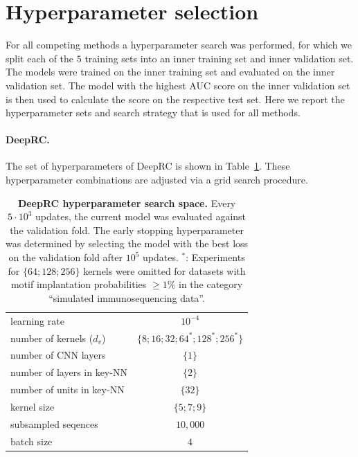 \documentclass[oneside]{book}
\begin{document}
\clearpage
\section{Hyperparameter selection}
\label{sec:hyperparams}
For all competing methods a hyperparameter search was performed,
for which we split each 
of the $5$ training sets into an inner training set and 
inner validation set.
The models were trained on the inner training set and 
evaluated on the inner validation set.
The model with the highest AUC score on the inner validation 
set is then used to 
calculate the score on the respective test set.
Here
we report the hyperparameter sets and search strategy that is
used for all methods. 

\paragraph{DeepRC.}
The set of hyperparameters of DeepRC is shown in 
Table~\ref{tab:deeprc_settings}. These hyperparameter
combinations are adjusted via a grid search procedure.

\begin{table}[htp]%
    \begin{center}%
        \begin{tabular}{lc}%
            \toprule
            learning rate & $10^{-4}$ \\
            number of kernels ($d_v$) & $\{8;16;32;64^*;128^*;256^*\}$ \\
            number of CNN layers & $\{1\}$ \\
            number of layers in key-NN & $\{2\}$ \\
            number of units in key-NN & $\{32\}$ \\
            kernel size & $\{5;7;9\}$ \\
            subsampled seqences & $10,000$ \\
            batch size & $4$ \\
            \bottomrule
        \end{tabular}%
        \caption[DeepRC hyperparameter search space]{\textbf{DeepRC hyperparameter search space.}
        Every $5\cdot10^{3}$ updates, the current model was evaluated against the validation fold.
        The early stopping hyperparameter was determined by selecting the model with the best loss
        on the validation fold after $10^{5}$ updates.
        $^*$: Experiments for $\{64;128;256\}$ kernels were omitted for datasets with  motif implantation probabilities $\geq 1\%$ in the category ``simulated immunosequencing data''.
        }%
        \label{tab:deeprc_settings}%
    \end{center}%
\end{table}
\end{document}
